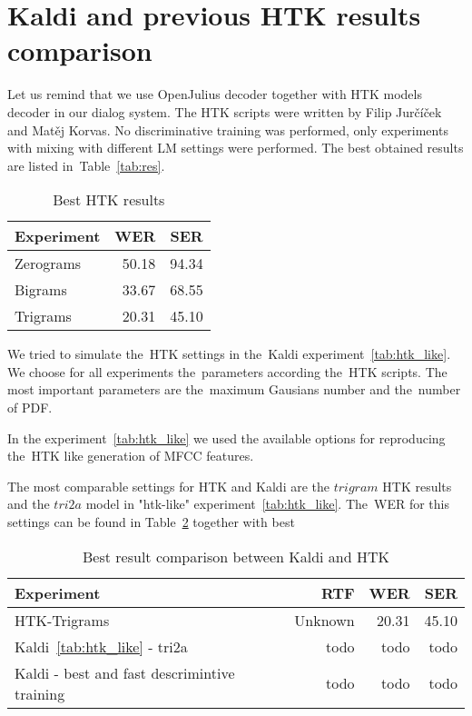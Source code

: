 \clearpage


\section[Kaldi and \ac{HTK}]{Kaldi and previous \ac{HTK} results comparison} 
\label{sec:compare}

Let us remind that we use OpenJulius decoder together with HTK models decoder in our dialog system.
The \ac{HTK} scripts were written by Filip Jurčíček and Matěj Korvas. No discriminative training was performed,
only experiments with mixing with different \acl{LM} settings were performed. 
The best obtained results are listed in~Table~\ref{tab:res}.

\begin{table}[!htp]\label{tab:htk_res}\centering\begin{tabular}{l|rr}
Experiment      & \ac{WER} & \ac{SER} \\
\hline
    Zerograms      & 50.18  & 94.34  \\
    Bigrams        & 33.67  & 68.55  \\
    Trigrams       & 20.31  & 45.10  \\
\end{tabular}
\caption{Best \ac{HTK} results}
\end{table}  

We tried to simulate the~\ac{HTK} settings in the~Kaldi experiment~\ref{tab:htk_like}.
We choose for all experiments the~parameters according the~\ac{HTK} scripts.
The most important parameters are the~maximum Gausians number and the~number of \acl{PDF}.

In the experiment~\ref{tab:htk_like} we used the available options for reproducing the~\ac{HTK} like generation
of \ac{MFCC} features.

The most comparable settings for \ac{HTK} and Kaldi are the $trigram$ \ac{HTK} results
and the $tri2a$ model in "htk-like" experiment~\ref{tab:htk_like}. 
The~\ac{WER} for this settings can be found in Table~\ref{tab:compare}
together with best 
\begin{table}[!htp]\label{tab:compare}\centering\begin{tabular}{l|rrr}
    Experiment   & \ac{RTF} & \ac{WER} & \ac{SER} \\
\hline
\hline
\ac{HTK}-Trigrams   & Unknown  & 20.31  & 45.10  \\
Kaldi~\ref{tab:htk_like} - tri2a & todo & todo   & todo \\
\hline
Kaldi - best and fast descrimintive training & todo  & todo   & todo \\
\end{tabular}
\caption{Best result comparison between Kaldi and \ac{HTK}}
\end{table}  


